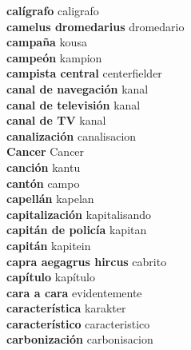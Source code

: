 \textbf{ calígrafo  } caligrafo \\
\textbf{ camelus dromedarius  } dromedario \\
\textbf{ campaña  } kousa \\
\textbf{ campeón  } kampion \\
\textbf{ campista central  } centerfielder \\
\textbf{ canal de navegación  } kanal \\
\textbf{ canal de televisión  } kanal \\
\textbf{ canal de TV  } kanal \\
\textbf{ canalización  } canalisacion \\
\textbf{ Cancer  } Cancer \\
\textbf{ canción  } kantu \\
\textbf{ cantón  } campo \\
\textbf{ capellán  } kapelan \\
\textbf{ capitalización  } kapitalisando \\
\textbf{ capitán de policía  } kapitan \\
\textbf{ capitán  } kapitein \\
\textbf{ capra aegagrus hircus  } cabrito \\
\textbf{ capítulo  } kapítulo \\
\textbf{ cara a cara  } evidentemente \\
\textbf{ característica  } karakter \\
\textbf{ característico  } caracteristico \\
\textbf{ carbonización  } carbonisacion \\
